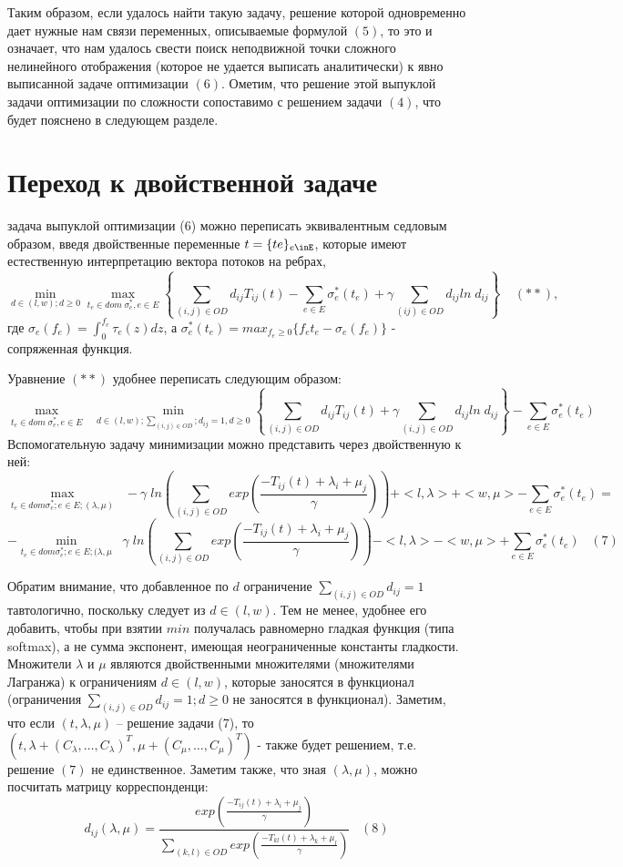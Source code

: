 \documentclass{article}
\begin{document}
Таким образом, если удалось найти такую задачу, решение которой одновременно дает нужные нам связи переменных, описываемые формулой $(5)$, то это и означает, что нам удалось свести поиск неподвижной точки сложного нелинейного отображения (которое не удается выписать аналитически) к явно выписанной задаче оптимизации $(6)$. Ометим, что решение этой выпуклой задачи оптимизации по сложности сопоставимо с решением задачи $(4)$, что будет пояснено в следующем разделе.

\section{Переход к двойственной задаче}
задача выпуклой оптимизации (6) можно переписать эквивалентным седловым образом, введя двойственные переменные $t = \{te\}_{e \inE}$,  которые имеют естественную интерпретацию вектора потоков на ребрах,
$$\min_{d\in(l,w); d \ge 0} \max_{t_e \in dom \; \sigma_e^*, e\in E} \left\{\sum_{(i,j) \in OD}d_{ij}T_{ij}(t) - \sum_{e \in E} \sigma_e^*(t_e) + \gamma \sum_{(ij) \in OD} d_{ij} ln \; d_{ij} \right\} \;\;\;\; (**),$$
где $\sigma_e(f_e) = \int_0^{f_e}\tau_e(z)dz$, а $\sigma_e^*(t_e) = max_{f_e\ge 0 }\{f_et_e - \sigma_e(f_e) \}$ - сопряженная функция.

Уравнение $(**)$ удобнее переписать следующим образом:
$$\max_{t_e \in dom \; \sigma_e^*, e \in E} \;\; \min_{d\in (l,w); \sum_{(i,j) \in OD};d_{ij} = 1, d \ge 0} \left\{\sum_{(i,j) \in OD} d_{ij}T_{ij}(t) + \gamma \sum_{(i,j) \in OD}d_{ij} ln\;d_{ij} \right\} - \sum_{e \in E}\sigma_e^*(t_e)$$
Вспомогательную задачу минимизации можно представить через двойственную к ней:
$$\max_{t_e \in dom \sigma_e^*; e \in E; (\lambda, \mu)}\;\; - \gamma \; ln \left( \sum_{(i,j) \in OD} exp\left(\frac{-T_{ij}(t) + \lambda_i + \mu_j}{\gamma} \right) \right) + <l,\lambda> +<w, \mu> - \sum_{e \in E}\sigma_e^*(t_e) =$$
$$-\min_{t_e \in dom \sigma_e^*; e \in E; (\lambda, \mu}\;\; \gamma \; ln \left( \sum_{(i,j) \in OD} exp\left(\frac{-T_{ij}(t) + \lambda_i + \mu_j}{\gamma} \right) \right) - <l,\lambda> -<w, \mu> + \sum_{e \in E}\sigma_e^*(t_e) \;\;\; (7)$$

Обратим внимание, что добавленное по $d$ ограничение $ \sum_{(i,j) \in OD} d_{ij} = 1$ тавтологично, поскольку следует из $d \in (l, w)$. Тем не менее, удобнее его добавить, чтобы при взятии $min$ получалась равномерно гладкая функция (типа softmax), а не сумма экспонент, имеющая неограниченные константы гладкости. Множители $\lambda$ и $\mu$ являются двойственными множителями (множителями Лагранжа) к ограничениям $d \in (l, w)$, которые заносятся в функционал (ограничения $\sum_{(i,j) \in OD} d_{ij} = 1; d \ge 0$ не заносятся в функционал). Заметим, что если $(t, \lambda, \mu)$ – решение задачи (7), то
$(t, \lambda +  (C_{\lambda}, \ldots,C_{\lambda})^{T}, \mu + (C_{\mu}, \ldots, C_{\mu})^{T})$ - также будет решением, т.е. решение $(7)$ не единственное.  Заметим также, что зная $(\lambda, \mu)$, можно посчитать матрицу корреспонденци:
$$d_{ij}(\lambda, \mu) = \frac{exp\left(\frac{-T_{ij}(t) + \lambda_i + \mu_j}{\gamma} \right)}{\sum_{(k,l) \in OD} exp \left(\frac{-T_{kl}(t) + \lambda_k + \mu_l}{\gamma} \right)} \;\;\; (8)$$
\end{document}
